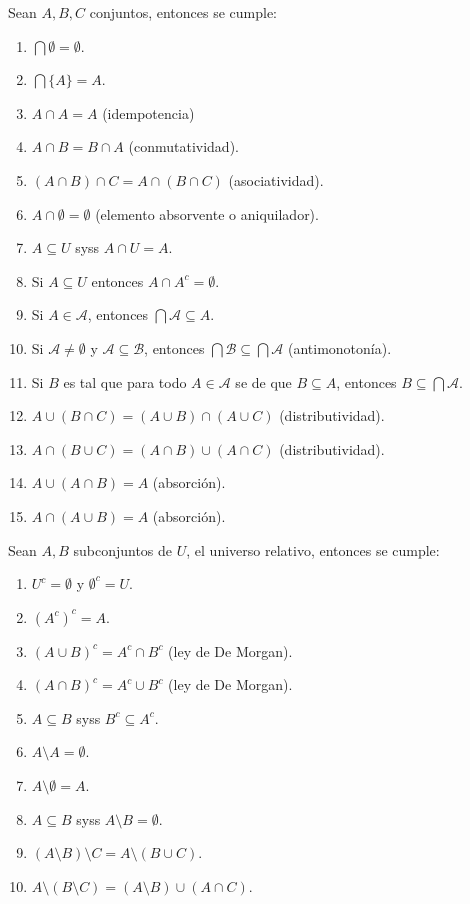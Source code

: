 \documentclass[11pt,a4paper]{book}
\begin{document}
\begin{prop}
	Sean $A,B,C$ conjuntos, entonces se cumple:
	\begin{enumerate}
		\item $\bigcap\emptyset = \emptyset$.
		\item $\bigcap\{A\} = A$.
		\item $A\cap A=A$ (idempotencia)
		\item $A\cap B=B\cap A$ (conmutatividad).
		\item $(A\cap B)\cap C=A\cap(B\cap C)$ (asociatividad).
		\item $A\cap\emptyset=\emptyset$ (elemento absorvente o aniquilador).
		\item $A\subseteq U$ syss $A\cap U=A$.
		\item Si $A\subseteq U$ entonces $A\cap A^c=\emptyset$.
		\item Si $A\in\mathcal{A}$, entonces $\bigcap\mathcal{A}\subseteq A$.
		\item Si $\mathcal{A}\neq\emptyset$ y $\mathcal{A}\subseteq\mathcal{B}$, entonces $\bigcap\mathcal{B}\subseteq\bigcap\mathcal{A}$ (antimonotonía).
		\item Si $B$ es tal que para todo $A\in\mathcal{A}$ se de que $B\subseteq A$, entonces $B\subseteq \bigcap\mathcal{A}$.
		\item $A\cup(B\cap C)=(A\cup B)\cap(A\cup C)$ (distributividad).
		\item $A\cap(B\cup C)=(A\cap B)\cup(A\cap C)$ (distributividad).
		\item $A\cup(A\cap B)=A$ (absorción).
		\item $A\cap(A\cup B)=A$ (absorción).
	\end{enumerate}
\end{prop}
\begin{prop}
	Sean $A,B$ subconjuntos de $U$, el universo relativo, entonces se cumple:
	\begin{enumerate}
		\item $U^c=\emptyset$ y $\emptyset^c=U$.
		\item $(A^c)^c=A$.
		\item $(A\cup B)^c=A^c\cap B^c$ (ley de De Morgan).
		\item $(A\cap B)^c=A^c\cup B^c$ (ley de De Morgan).
		\item $A\subseteq B$ syss $B^c\subseteq A^c$.
		\item $A\setminus A=\emptyset$.
		\item $A\setminus\emptyset=A$.
		\item $A\subseteq B$ syss $A\setminus B=\emptyset$.
		\item $(A\setminus B)\setminus C=A\setminus(B\cup C)$.
		\item $A\setminus(B\setminus C)=(A\setminus B)\cup(A\cap C)$.
	\end{enumerate}
\end{prop}
\end{document}
